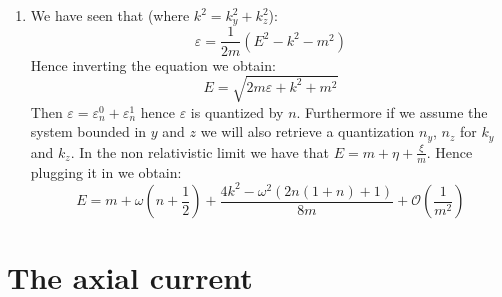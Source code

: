 \documentclass[10pt,a4paper]{article}
\begin{document}
\begin{enumerate}
\item We have seen that (where $k^2 = k_y^2 + k_z^2$):
\[
\varepsilon = \frac{1}{2m}(E^2 - k^2 - m^2)
\]
Hence inverting the equation we obtain:
\[
E = \sqrt{2m \varepsilon + k^2 + m^2}
\]
Then $\varepsilon = \varepsilon_n^0 + \varepsilon_n^1$ hence $\varepsilon$ is quantized by $n$. Furthermore if we assume the system bounded in $y$ and $z$ we will also retrieve a quantization $n_y$, $n_z$ for $k_y$ and $k_z$. In the non relativistic limit we have that $E = m + \eta + \frac{\xi}{m}$. Hence plugging it in we obtain:
\[
E = m + \omega \left( n + \frac{1}{2} \right) + \frac{4k^2 - \omega^2(2n(1 + n) + 1)}{8m} + \mathcal{O}(\frac{1}{m^2})
\]

\end{enumerate}

\section{The axial current}
\end{document}

